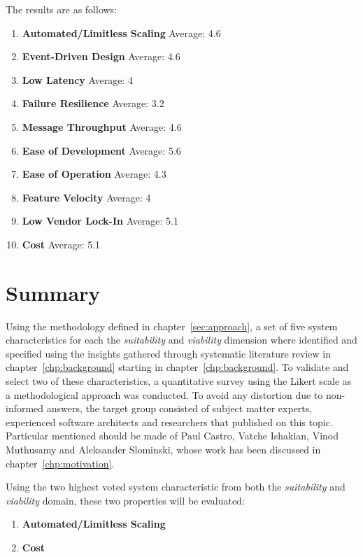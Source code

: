 \begin{minipage}{\textwidth}
    The results are as follows:
    
    \begin{enumerate}[nolistsep]\label{lst:surveyResults}
        \item \textbf{Automated/Limitless Scaling} Average: 4.6
        \item \textbf{Event-Driven Design} Average: 4.6
        \item \textbf{Low Latency} Average: 4
        \item \textbf{Failure Resilience} Average: 3.2
        \item \textbf{Message Throughput} Average: 4.6
        \item \textbf{Ease of Development} Average: 5.6
        \item \textbf{Ease of Operation} Average: 4.3
        \item \textbf{Feature Velocity} Average: 4
        \item \textbf{Low Vendor Lock-In} Average: 5.1
        \item \textbf{Cost} Average: 5.1
    \end{enumerate}
\end{minipage}

\section{Summary}

Using the methodology defined in chapter~\vref{sec:approach}, a set of five system characteristics for each the \textit{suitability} and \textit{viability} dimension where identified and specified using the insights gathered through systematic literature review in chapter~\vref{chp:background} starting in chapter~\vref{chp:background}. To validate and select two of these characteristics, a quantitative survey using the Likert scale as a methodological approach was conducted. To avoid any distortion due to non-informed answers, the target group consisted of subject matter experts, experienced software architects and researchers that published on this topic. Particular mentioned should be made of Paul Castro, Vatche Ishakian, Vinod Muthusamy and Aleksander Slominski, whose work has been discussed in chapter~\vref{chp:motivation}. 

Using the two highest voted system characteristic from both the \textit{suitability} and \textit{viability} domain, these two properties will be evaluated:
\begin{enumerate}[nolistsep]
    \item \textbf{Automated/Limitless Scaling}
    \item \textbf{Cost}
\end{enumerate}
